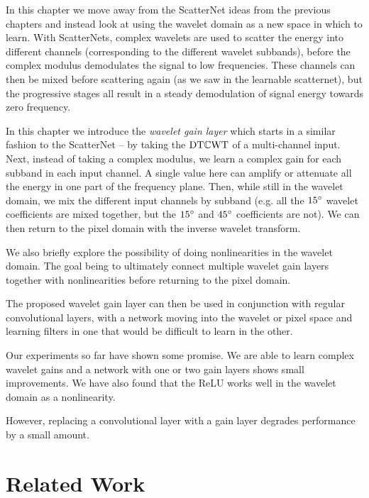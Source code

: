 In this chapter we move away from the ScatterNet ideas from the previous 
chapters and instead look at using the wavelet domain as a new space in which to
learn. With ScatterNets, complex wavelets are used to scatter the energy into
different channels (corresponding to the different wavelet subbands), before the
complex modulus demodulates the signal to low frequencies. These channels can
then be mixed before scattering again (as we saw in the learnable scatternet),
but the progressive stages all result in a steady demodulation of signal energy
towards zero frequency. 

In this chapter we introduce the \emph{wavelet gain layer}
which starts in a similar fashion to the ScatterNet -- by taking the $\mathrm{DT}\mathbb{C}\mathrm{WT}$ of
a multi-channel input. Next, instead of taking a complex modulus, we learn a 
complex gain for each subband in each input channel. A single value here can 
amplify or attenuate all the energy in one part of the frequency plane. Then, 
while still in the wavelet domain, we mix the different input channels by subband (e.g.
all the $15^{\circ}$ wavelet coefficients are mixed together, but the $15^{\circ}$ and
$45^{\circ}$ coefficients are not). We can then return to the pixel
domain with the inverse wavelet transform. 

We also briefly explore the possibility of doing nonlinearities in the wavelet
domain. The goal being to ultimately connect multiple wavelet gain layers
together with nonlinearities before returning to the pixel domain. 

The proposed wavelet gain layer can then be used in conjunction with regular
convolutional layers, with a network moving into the wavelet or pixel space and
learning filters in one that would be difficult to learn in the other.

Our experiments so far have shown some promise. We are able to learn complex
wavelet gains and a network with one or two gain layers shows small improvements. 
We have also found that the ReLU works well in the wavelet domain as a
nonlinearity.

However, replacing a convolutional layer with a gain layer degrades performance
by a small amount.


\section{Related Work}\label{sec:ch6:related} 
